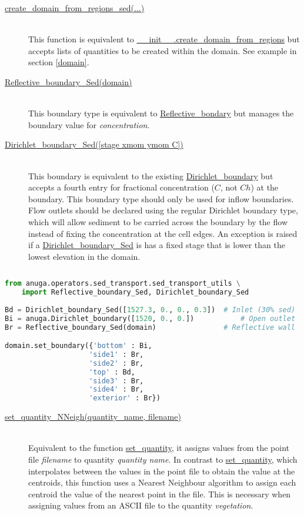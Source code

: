 \documentclass[10pt]{article}
\begin{document}
\begin{description}
\item[\url{create_domain_from_regions_sed(...)}] \hfill \\
This function is equivalent to \url{__init__.create_domain_from_regions} but accepts lists of quantities to be created within the domain. See example in section \ref{domain}.

\item[\url{Reflective_boundary_Sed(domain)}] \hfill \\
This boundary type is equivalent to \url{Reflective_bondary} but manages the boundary value for \textit{concentration}.

\item[\url{Dirichlet_boundary_Sed([stage xmom ymom C])}] \hfill \\
This boundary is equivalent to the existing \url{Dirichlet_boundary} but accepts a fourth entry for fractional concentration ($C$, not $C h$) at the boundary. This boundary type should only be used for inflow boundaries. Flow outlets should be declared using the regular Dirichlet boundary type, which will allow sediment to be carried across the boundary by the flow instead of fixing the concentration at the cell edges. An exception is raised if a \url{Dirichlet_boundary_Sed} is has a fixed stage that is lower than the lowest elevation in the domain.
\end{description}

\begin{lstlisting}[language=Python, caption=Using operator-specific boundary types]
 
from anuga.operators.sed_transport.sed_transport_utils \
	import Reflective_boundary_Sed, Dirichlet_boundary_Sed
	
Bd = Dirichlet_boundary_Sed([1527.3, 0., 0., 0.3])	# Inlet (30% sed)
Bi = anuga.Dirichlet_boundary([1520, 0., 0.])			# Open outlet
Br = Reflective_boundary_Sed(domain)				# Reflective wall

domain.set_boundary({'bottom' : Bi,
					'side1' : Br,
					'side2' : Br,
					'top' : Bd,
					'side3' : Br,
					'side4' : Br,
					'exterior' : Br})
\end{lstlisting}

\begin{description}
\item[\url{set_quantity_NNeigh(quantity_name, filename)}] \hfill \\
Equivalent to the function \url{set_quantity}, it assigns values from the point file \textit{filename} to quantity \textit{quantity name}. In contrast to \url{set_quantity}, which interpolates between the values in the point file to obtain the value at the centroids, this function uses a Nearest Neighbour algorithm to assign each centroid the value of the nearest point in the file. This is necessary when assigning values from an ASCII file to the quantity \textit{vegetation}.
\end{description}
\end{document}
